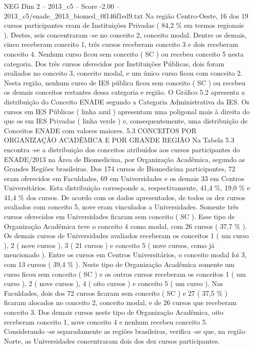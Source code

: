 \begin{textsample}{NEG Dim 2 – 2013\_c5 – Score -2.00 – 2013\_c5/enade\_2013\_biomed\_0f146f1ed9.txt}
Na região Centro-Oeste, 16 dos 19 cursos participantes eram de Instituições Privadas ( 84,2 \% em termos regionais ).
Destes, seis concentraram -se no conceito 2, conceito modal.
Dentre os demais, cinco receberam conceito 1, três cursos receberam conceito 3 e dois receberam conceito 4.
Nenhum curso ficou sem conceito ( SC ) ou recebeu conceito 5 nesta categoria.
Dos três cursos oferecidos por Instituições Públicas, dois foram avaliados no conceito 3, conceito modal, e um único curso ficou com conceito 2.
Nesta região, nenhum curso de IES pública ficou sem conceito ( SC ) ou recebeu os demais conceitos restantes dessa categoria e região.
O Gráfico 5.2 apresenta a distribuição do Conceito ENADE segundo a Categoria Administrativa da IES.
Os cursos em IES Públicas ( linha azul ) apresentam uma poligonal mais à direita do que os em IES Privadas ( linha verde ) e, consequentemente, uma distribuição de Conceitos ENADE com valores maiores. 5.3 CONCEITOS POR ORGANIZAÇÃO ACADÊMICA E POR GRANDE REGIÃO Na Tabela 5.3 encontra -se a distribuição dos conceitos atribuídos aos cursos participantes do ENADE/2013 na Área de Biomedicina, por Organização Acadêmica, segundo as Grandes Regiões brasileiras.
Dos 174 cursos de Biomedicina participantes, 72 eram oferecidos em Faculdades, 69 em Universidades e os demais 33 em Centros Universitários.
Esta distribuição corresponde a, respectivamente, 41,4 \%, 19,0 \% e 41,4 \% dos cursos.
De acordo com os dados apresentados, de todos os dez cursos avaliados com conceito 5, nove eram vinculados a Universidades.
Somente três cursos oferecidos em Universidades ficaram sem conceito ( SC ).
Esse tipo de Organização Acadêmica teve o conceito 4 como modal, com 26 cursos ( 37,7 \% ).
Os demais cursos de Universidades avaliados receberam os conceitos 1 ( um curso ), 2 ( nove cursos ), 3 ( 21 cursos ) e conceito 5 ( nove cursos, como já mencionado ).
Entre os cursos em Centros Universitários, o conceito modal foi 3, com 13 cursos ( 39,4 \% ).
Neste tipo de Organização Acadêmica somente um curso ficou sem conceito ( SC ) e os outros cursos receberam os conceitos 1 ( um curso ), 2 ( nove cursos ), 4 ( oito cursos ) e conceito 5 ( um curso ).
Nas Faculdades, dois dos 72 cursos ficaram sem conceito ( SC ) e 27 ( 37,5 \% ) ficaram alocados no conceito 2, conceito modal, e de 26 cursos que receberam conceito 3.
Dos demais cursos neste tipo de Organização Acadêmica, oito receberam conceito 1, nove conceito 4 e nenhum recebeu conceito 5.
Considerando -se separadamente as regiões brasileiras, verifica -se que, na região Norte, as Universidades concentraram dois dos dez cursos participantes.

\end{textsample}
